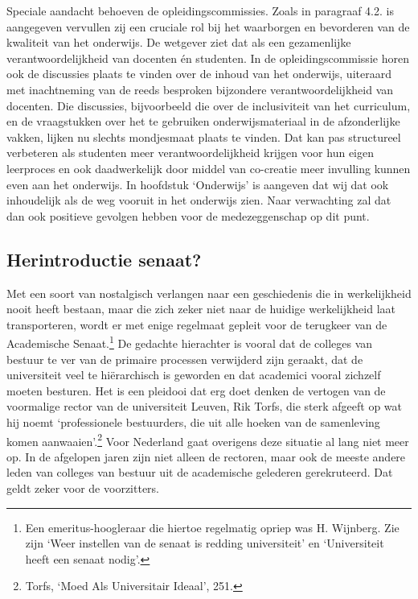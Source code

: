\documentclass[smallauthor, chapterhaspagenum, nochapterinheader, pagenuminheader,  bigchapnum,medium2, tocpages, garamond, titleinheader]{jote-book}
\begin{document}
	Speciale aandacht behoeven de opleidingscommissies. Zoals in paragraaf 4.2. is aangegeven vervullen zij een cruciale rol bij het waarborgen en bevorderen van de kwaliteit van het onderwijs. De wetgever ziet dat als een gezamenlijke verantwoordelijkheid van docenten én studenten. In de opleidingscommissie horen ook de discussies plaats te vinden over de inhoud van het onderwijs, uiteraard met inachtneming van de reeds besproken bijzondere verantwoordelijkheid van docenten. Die discussies, bijvoorbeeld die over de inclusiviteit van het curriculum, en de vraagstukken over het te gebruiken onderwijsmateriaal in de afzonderlijke vakken, lijken nu slechts mondjesmaat plaats te vinden. Dat kan pas structureel verbeteren als studenten meer verantwoordelijkheid krijgen voor hun eigen leerproces en ook daadwerkelijk door middel van co-creatie meer invulling kunnen even aan het onderwijs. In hoofdstuk ‘Onderwijs' is aangeven dat wij dat ook inhoudelijk als de weg vooruit in het onderwijs zien. Naar verwachting zal dat dan ook positieve gevolgen hebben voor de medezeggenschap op dit punt.



	\subsection{Herintroductie senaat?}



	Met een soort van nostalgisch verlangen naar een geschiedenis die in werkelijkheid nooit heeft bestaan, maar die zich zeker niet naar de huidige werkelijkheid laat transporteren, wordt er met enige regelmaat gepleit voor de terugkeer van de Academische Senaat.\footnote{Een emeritus-hoogleraar die hiertoe regelmatig opriep was H. Wijnberg. Zie zijn ‘Weer instellen van de senaat is redding universiteit' en ‘Universiteit heeft een senaat nodig'.} De gedachte hierachter is vooral dat de colleges van bestuur te ver van de primaire processen verwijderd zijn geraakt, dat de universiteit veel te hiërarchisch is geworden en dat academici vooral zichzelf moeten besturen. Het is een pleidooi dat erg doet denken de vertogen van de voormalige rector van de universiteit Leuven, Rik Torfs, die sterk afgeeft op wat hij noemt ‘professionele bestuurders, die uit alle hoeken van de samenleving komen aanwaaien'.\footnote{Torfs, ‘Moed Als Universitair Ideaal', 251. } Voor Nederland gaat overigens deze situatie al lang niet meer op. In de afgelopen jaren zijn niet alleen de rectoren, maar ook de meeste andere leden van colleges van bestuur uit de academische gelederen gerekruteerd. Dat geldt zeker voor de voorzitters.
\end{document}
